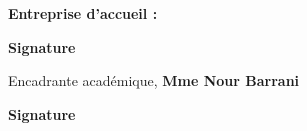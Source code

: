 \thispagestyle{empty}

\begin{center}
    \begin{minipage}[l]{1\columnwidth}
        \begin{tcolorbox}[colback=white,boxrule=5pt,arc=10pt,height=50mm]{
            \vspace{1cm}
            \large
            \textbf{Entreprise d'accueil :}
            \begin{center}
                \Large\textbf{\@companyName}
            \end{center}
            \vspace{0.3cm}
            \hspace{0.84\columnwidth}\textbf{\large Signature}
        }
        \end{tcolorbox}
    \end{minipage}
\end{center}

\vskip1cm

\begin{center}
    \begin{minipage}[l]{1\columnwidth}
        \begin{tcolorbox}[colback=white,boxrule=5pt,arc=10pt,height=105mm]{
            \vspace{2cm}
            \large \@academicSignSentence
            \vspace{1mm}
            \begin{center}
                \Large
                Encadrante académique, \textbf{Mme Nour Barrani}
            \end{center}
            \vspace{5mm}
            \hspace{0.84\columnwidth}\textbf{\large Signature}
        }
        \end{tcolorbox}
    \end{minipage}
\end{center}
